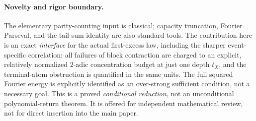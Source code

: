 \documentclass[11pt,a4paper]{article}
\begin{document}
\paragraph{Novelty and rigor boundary.}
The elementary parity-counting input is classical; capacity truncation, Fourier Parseval, and the tail-sum identity are also standard tools. The contribution here is an exact \emph{interface} for the actual first-excess law, including the sharper event-specific correlation: all failures of block contraction are charged to an explicit, relatively normalized $2$-adic concentration budget at just one depth $t_X$, and the terminal-atom obstruction is quantified in the same units. The full squared Fourier energy is explicitly identified as an over-strong sufficient condition, not a necessary goal. This is a proved \emph{conditional reduction}, not an unconditional polynomial-return theorem. It is offered for independent mathematical review, not for direct insertion into the main paper.
\end{document}
